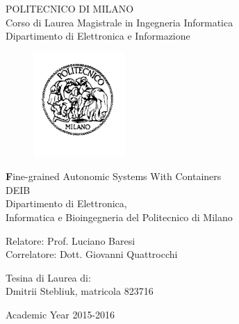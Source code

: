 \thispagestyle{empty}
\vspace*{-1.5cm} \bfseries{
\begin{center}
  \large
  POLITECNICO DI MILANO\\
  \normalsize
  Corso di Laurea Magistrale in Ingegneria Informatica\\
  Dipartimento di Elettronica e Informazione\\
  \begin{figure}[htbp]
    \begin{center}
      \includegraphics[width=3.5cm]{./pictures/logopm}
    \end{center}
  \end{figure}
  \vspace*{0.3cm} \LARGE

  \textbf Fine-grained Autonomic Systems With Containers\\

  \vspace*{.75truecm} \large
  DEIB \\
  Dipartimento di Elettronica,   \\
  Informatica e Bioingegneria del Politecnico di Milano
\end{center}
\vspace*{3.0cm} \large
\begin{flushleft}


  Relatore: Prof. Luciano Baresi \\
  Correlatore: Dott. Giovanni Quattrocchi 

\end{flushleft}
\vspace*{1.0cm}
\begin{flushright}


  Tesina di Laurea di:\\ Dmitrii Stebliuk, matricola 823716 \\ 


\end{flushright}
\vspace*{0.5cm}
\begin{center}



  Academic Year 2015-2016
\end{center} \clearpage
}
